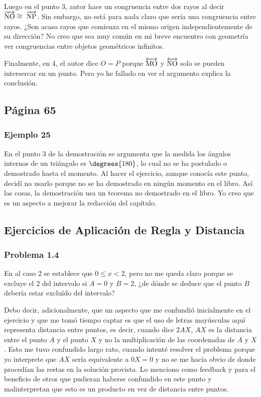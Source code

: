 Luego en el punto 3, autor hace un congruencia entre dos rayos al decir \(\overrightarrow{\rm NO} \cong\ \overrightarrow{\rm NP}\). Sin embargo, no está para nada claro que sería una congruencia entre rayos. ¿Son acaso rayos que comienza en el mismo origen independientemente de su dirección? No creo que sea muy común en mi breve encuentro con geometría ver congruencias entre objetos geométricos infinitos. 

Finalmente, en 4, el autor dice \(O=P\) porque \(\overleftrightarrow{\rm MO}\) y \(\overleftrightarrow{\rm NO}\) solo se pueden intersercar en un punto. Pero yo he fallado en ver el argumento explica la conclusión.

\subsection{Página 65}
\subsubsection{Ejemplo 25}

En el punto 3 de la demostración se argumenta que la medida los ángulos internos de un triángulo es \(\degrees{180}\), lo cual no se ha postulado o demostrado hasta el momento. Al hacer el ejercicio, aunque conocía este punto, decidí no usarlo porque no se ha demostrado en ningún momento en el libro. Así las cosas, la demostración usa un teorema no demostrado en el libro. Yo creo que es un aspecto a mejorar la redacción del capítulo.

\subsection{Ejercicios de Aplicación de Regla y Distancia}
\subsubsection{Problema 1.4}

En al caso 2 se establece que $0 \leq x < 2$, pero no me queda claro porque se excluye el $2$ del intervalo si $A=0$ y $B=2$, ¿de dónde se deduce que el punto $B$ debería estar excluído del intervalo?

Debo decir, adicionalmente, que un aspecto que me confundió inicialmente en el ejercicio y que me tomó tiempo captar es que el uso de letras mayúsculas aquí representa distancia entre puntos, es decir, cuando dice $2AX$, $AX$ es la distancia entre el punto $A$ y el punto $X$ y no la multiplicación de las coordenadas de $A$ y $X$. Esto me tuvo confundido largo rato, cuando intenté resolver el problema porque yo interprete que $AX$ sería equivalente a $0X = 0$ y no se me hacía obvio de donde procedían las restas en la solución provista. Lo menciono como feedback y para el beneficio de otros que pudieran haberse confundido en este punto y malinterpretan que esto es un producto en vez de distancia entre puntos.

